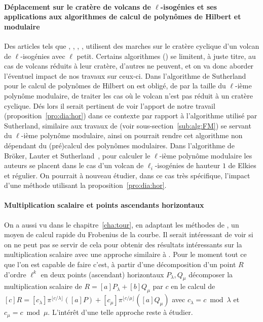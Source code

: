 \documentclass[10pt,a4paper]{book}
\theoremstyle{plain}
\theoremstyle{definition}
\theoremstyle{definition}
\theoremstyle{definition}
\theoremstyle{definition}
\theoremstyle{definition}
\theoremstyle{remark}
\theoremstyle{remark}
\theoremstyle{definition}
\begin{document}
\paragraph{Déplacement sur le cratère de volcans de $\ell$-isogénies et ses 
applications aux algorithmes de calcul de polynômes de Hilbert et modulaire}
Des articles tels que \cite{Couveignes96isogenycycles}, \cite{Broker08}, 
\cite{Sutherland11a}, \cite{BLS12}, utilisent des marches sur le cratère 
cyclique d'un volcan de $\ell$-isogénies avec $\ell$ petit. Certains 
algorithmes (\cite{Couveignes96isogenycycles}) se limitent, à juste titre, au 
cas de volcans réduits à leur cratère, d'autres ne peuvent, et on va donc 
aborder l'éventuel impact de nos travaux sur ceux-ci.
Dans l'algorithme de Sutherland~\cite{Sutherland11a} pour le calcul de polynômes
de Hilbert on est obligé, de par la taille du $\ell$-ième 
polynôme modulaire, de traiter les cas où le volcan n'est pas réduit à un
cratère cyclique. Dés lors il serait pertinent de voir l'apport de notre 
travail (proposition~\ref{pro:dia:hor}) dans ce contexte par rapport à 
l'algorithme utilisé par Sutherland, similaire aux travaux de 
\cite{FouquetMorain02} (voir sous-section~\ref{sub:alg:FM}) se servant
du $\ell$-ième polynôme modulaire, ainsi on pourrait rendre cet algorithme non
dépendant du (pré)calcul des polynômes modulaires.
Dans l'algorithme de Bröker, Lauter et Sutherland~\cite{BLS12}, pour 
calculer le $\ell$-ième polynôme modulaire les auteurs se placent dans le cas
d'un volcan de $\ell_i$-isogénies de hauteur $1$ de Elkies et régulier. 
On pourrait à nouveau étudier, dans ce cas très spécifique, l'impact d'une 
méthode utilisant la proposition~\ref{pro:dia:hor}.

\paragraph{Multiplication scalaire et points ascendants horizontaux}
On a aussi vu dans le chapitre~\ref{cha:tour}, en adaptant les méthodes de 
\cite{Doliskani-Schost15}, un moyen de calcul 
rapide du Frobenius de la courbe. Il serait intéressant de voir si on ne peut 
pas se servir de cela pour obtenir des résultats intéressants sur la 
multiplication scalaire avec une approche similaire à 
\cite{GallantLambertVanstone01}.
Pour le moment tout ce que l'on est capable de faire c'est, à partir d'une 
décomposition d'un point $R$ d'ordre $\ell^k$ en deux points (ascendant) 
horizontaux $P_{\lambda}, Q_{\mu}$ décomposer la multiplication scalaire de 
$R=[a]P_{\lambda} + [b] Q_{\mu}$ par $c$ en le calcul de $[c]R=[c_{\lambda}] 
\pi^{\lfloor c/\lambda \rfloor}([a]P)+[c_{\mu}]\pi^{\lfloor c/\mu \rfloor}
([a]Q_{\mu})$  avec $c_{\lambda}=c \bmod \lambda$ et $c_{\mu}=c \bmod \mu$. 
L'intérêt d'une telle approche reste à étudier.
\end{document}
